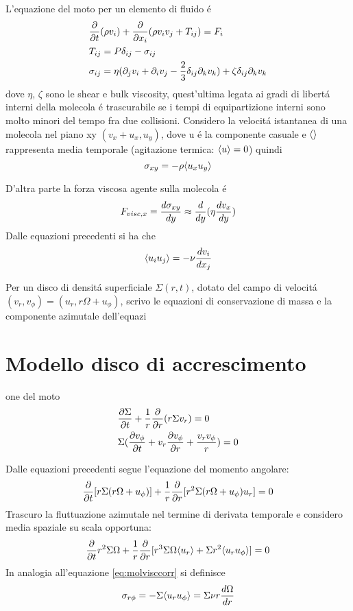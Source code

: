 L'equazione del moto per un elemento di fluido \'e
\begin{align}
&\PDof{t}(\rho v_i)+\PDof{x_i}(\rho v_iv_j+T_{ij})=F_i\label{eq:fluidmotion}\\
&T_{ij}=P\delta_{ij}-\sigma_{ij}\\
&\sigma_{ij}=\eta(\partial_jv_i+\partial_iv_j-\frac{2}{3}\delta_{ij}\partial_kv_k)+\zeta\delta_{ij}\partial_kv_k
\end{align}
dove $\eta$, $\zeta$ sono le shear e bulk viscosity, quest'ultima legata ai gradi di libert\'a interni della molecola \'e trascurabile se i tempi di equipartizione interni sono molto minori del tempo fra due collisioni.
Considero la velocit\'a istantanea di una molecola nel piano xy $(v_x+u_x,u_y)$, dove u \'e la componente casuale e $\exv{}$ rappresenta media temporale (agitazione termica: $\exv{u}=0$) quindi
\begin{equation}
\sigma_{xy}=-\rho\exv{u_xu_y}
\end{equation}

D'altra parte la forza viscosa agente sulla molecola \'e
\begin{equation}
F_{visc,x}=\TDy{y}{\sigma_{xy}}\approx\TDof{y}(\eta\TDy{y}{v_x})
\end{equation}
Dalle equazioni precedenti si ha che
\begin{equation}
\exv{u_iu_j}=-\nu\TDy{x_j}{v_i}\label{eq:molvisccorr}
\end{equation}

Per un disco di densit\'a superficiale $\Sigma(r,t)$, dotato del campo di velocit\'a $(v_r,v_{\phi})=(u_r,r\Omega+u_{\phi})$, scrivo le equazioni di conservazione di massa e la componente azimutale dell'equazi\section{Modello disco di accrescimento}
one del moto
\begin{align}
&\PDy{t}{\Sigma}+\frac{1}{r}\PDof{r}(r\Sigma v_r)=0\label{eq:massconservation}\\
&\Sigma(\PDy{t}{v_{\phi}}+v_r\PDy{r}{v_{\phi}}+\frac{v_rv_{\phi}}{r})=0
\end{align}

Dalle equazioni precedenti segue l'equazione del momento angolare:
\begin{equation}
\PDof{t}[r\Sigma(r\Omega+u_{\phi})]+\frac{1}{r}\PDof{r}[r^2\Sigma(r\Omega+u_{\phi})u_r]=0
\end{equation}
Trascuro la fluttuazione azimutale nel termine di derivata temporale e considero media spaziale su scala opportuna:
\begin{equation}
\PDof{t}r^2\Sigma\Omega+\frac{1}{r}\PDof{r}[r^3\Sigma\Omega\exv{u_r}+\Sigma r^2\exv{u_ru_{\phi}}]=0\label{eq:smoothedangularmomentumequation}
\end{equation}
In analogia all'equazione \eqref{eq:molvisccorr} si definisce
\begin{equation}
\sigma_{r\phi}=-\Sigma\exv{u_ru_{\phi}}=\Sigma\nu r \TDy{r}{\Omega}
\end{equation}

